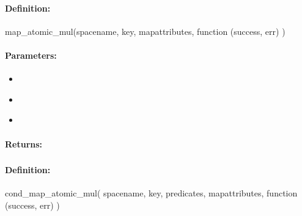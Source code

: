 \paragraph{Definition:}
\begin{javascriptcode}
map_atomic_mul(spacename, key, mapattributes, function (success, err) {})
\end{javascriptcode}
\paragraph{Parameters:}
\begin{itemize}[noitemsep]
\item {}\\

\item {}\\

\item {}\\

\end{itemize}

\paragraph{Returns:}


\pagebreak
\subsubsection{}
\label{api:nodejs:cond_map_atomic_mul}


\paragraph{Definition:}
\begin{javascriptcode}
cond_map_atomic_mul(
        spacename, key, predicates, mapattributes, function (success, err) {})
\end{javascriptcode}
